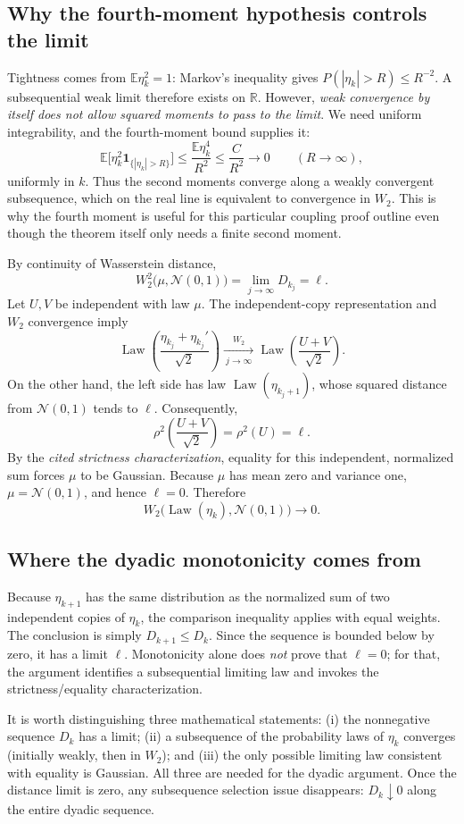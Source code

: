 \documentclass[10pt,a4paper]{article}
\newcommand{\Law}{\operatorname{Law}}
\newcommand{\E}{\mathbb E}
\newcommand{\N}{\mathcal N}
\newcommand{\W}{W_2}
\begin{document}
\subsection*{Why the fourth-moment hypothesis controls the limit}
Tightness comes from $\E\eta_k^2=1$: Markov's inequality gives $P(|\eta_k|>R)\le R^{-2}$. A subsequential weak limit therefore exists on $\mathbb R$. However, \emph{weak convergence by itself does not allow squared moments to pass to the limit}. We need uniform integrability, and the fourth-moment bound supplies it:
\[
\E\bigl[\eta_k^2\mathbf1_{\{|\eta_k|>R\}}\bigr]
\le \frac{\E\eta_k^4}{R^2}
\le\frac{C}{R^2}\longrightarrow0
\qquad(R\to\infty),
\]
uniformly in $k$. Thus the second moments converge along a weakly convergent subsequence, which on the real line is equivalent to convergence in $W_2$. This is why the fourth moment is useful for this particular coupling proof outline even though the theorem itself only needs a finite second moment.

By continuity of Wasserstein distance,
\[
\W^2\bigl(\mu,\N(0,1)\bigr)=\lim_{j\to\infty}D_{k_j}=\ell.
\]
Let $U,V$ be independent with law $\mu$. The independent-copy representation and $W_2$ convergence imply
\[
\Law\left(\frac{\eta_{k_j}+\eta_{k_j}'}{\sqrt2}\right)
\xrightarrow[\ j\to\infty\ ]{\,W_2\,}
\Law\left(\frac{U+V}{\sqrt2}\right).
\]
On the other hand, the left side has law $\Law(\eta_{k_j+1})$, whose squared distance from $\N(0,1)$ tends to $\ell$. Consequently,
\[
\rho^2\left(\frac{U+V}{\sqrt2}\right)=\rho^2(U)=\ell.
\]
By the \emph{cited strictness characterization}, equality for this independent, normalized sum forces $\mu$ to be Gaussian. Because $\mu$ has mean zero and variance one, $\mu=\N(0,1)$, and hence $\ell=0$. Therefore
\[
\W\bigl(\Law(\eta_k),\N(0,1)\bigr)\longrightarrow0.
\]


\subsection*{Where the dyadic monotonicity comes from}
Because $\eta_{k+1}$ has the same distribution as the normalized sum of two independent copies of $\eta_k$, the comparison inequality applies with equal weights. The conclusion is simply $D_{k+1}\le D_k$. Since the sequence is bounded below by zero, it has a limit $\ell$. Monotonicity alone does \emph{not} prove that $\ell=0$; for that, the argument identifies a subsequential limiting law and invokes the strictness/equality characterization.

It is worth distinguishing three mathematical statements: (i) the nonnegative sequence $D_k$ has a limit; (ii) a subsequence of the probability laws of $\eta_k$ converges (initially weakly, then in $W_2$); and (iii) the only possible limiting law consistent with equality is Gaussian. All three are needed for the dyadic argument. Once the distance limit is zero, any subsequence selection issue disappears: $D_k\downarrow0$ along the entire dyadic sequence.
\end{document}
